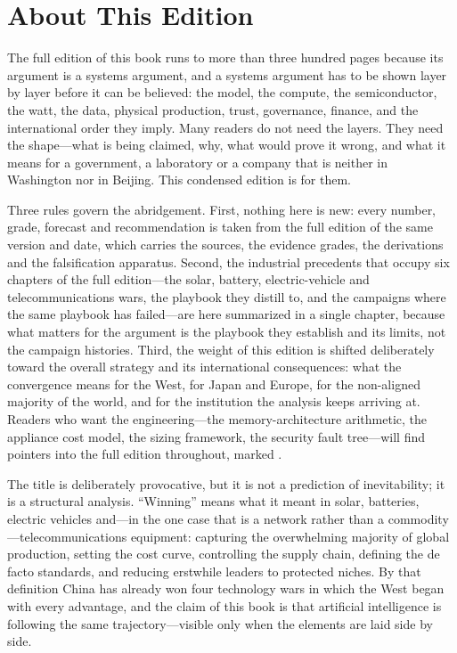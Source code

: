 \chapter*{About This Edition}

The full edition of this book runs to more than three hundred pages because its argument is a systems argument, and a systems argument has to be shown layer by layer before it can be believed: the model, the compute, the semiconductor, the watt, the data, physical production, trust, governance, finance, and the international order they imply. Many readers do not need the layers. They need the shape---what is being claimed, why, what would prove it wrong, and what it means for a government, a laboratory or a company that is neither in Washington nor in Beijing. This condensed edition is for them.

Three rules govern the abridgement. First, nothing here is new: every number, grade, forecast and recommendation is taken from the full edition of the same version and date, which carries the sources, the evidence grades, the derivations and the falsification apparatus. Second, the industrial precedents that occupy six chapters of the full edition---the solar, battery, electric-vehicle and telecommunications wars, the playbook they distill to, and the campaigns where the same playbook has failed---are here summarized in a single chapter, because what matters for the argument is the playbook they establish and its limits, not the campaign histories. Third, the weight of this edition is shifted deliberately toward the overall strategy and its international consequences: what the convergence means for the West, for Japan and Europe, for the non-aligned majority of the world, and for the institution the analysis keeps arriving at. Readers who want the engineering---the memory-architecture arithmetic, the appliance cost model, the sizing framework, the security fault tree---will find pointers into the full edition throughout, marked .

The title is deliberately provocative, but it is not a prediction of inevitability; it is a structural analysis. ``Winning'' means what it meant in solar, batteries, electric vehicles and---in the one case that is a network rather than a commodity---telecommunications equipment: capturing the overwhelming majority of global production, setting the cost curve, controlling the supply chain, defining the de facto standards, and reducing erstwhile leaders to protected niches. By that definition China has already won four technology wars in which the West began with every advantage, and the claim of this book is that artificial intelligence is following the same trajectory---visible only when the elements are laid side by side.

